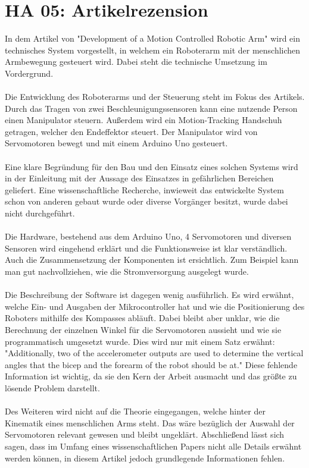 \section{HA 05: Artikelrezension}
  In dem Artikel von \cite{jiang_development_2017} "Development of a Motion Controlled Robotic Arm" wird ein technisches System vorgestellt, in welchem ein Roboterarm mit der menschlichen Armbewegung gesteuert wird. Dabei steht die technische Umsetzung im Vordergrund.\\\\
  Die Entwicklung des Roboterarms und der Steuerung steht im Fokus des Artikels. Durch das Tragen von zwei Beschleunigungssensoren kann eine nutzende Person einen Manipulator steuern. Außerdem wird ein Motion-Tracking Handschuh getragen, welcher den Endeffektor steuert. Der Manipulator wird von Servomotoren bewegt und mit einem Arduino Uno gesteuert.\\\\
  Eine klare Begründung für den Bau und den Einsatz eines solchen Systems wird in der Einleitung mit der Aussage des Einsatzes in gefährlichen Bereichen geliefert. Eine wissenschaftliche Recherche, inwieweit das entwickelte System schon von anderen gebaut wurde oder diverse Vorgänger besitzt, wurde dabei nicht durchgeführt.\\\\
  Die Hardware, bestehend aus dem Arduino Uno, 4 Servomotoren und diversen Sensoren wird eingehend erklärt und die Funktionsweise ist klar verständlich. Auch die Zusammensetzung der Komponenten ist ersichtlich. Zum Beispiel kann man gut nachvollziehen, wie die Stromversorgung ausgelegt wurde.\\\\
  Die Beschreibung der Software ist dagegen wenig ausführlich. Es wird erwähnt, welche Ein- und Ausgaben der Mikrocontroller hat und wie die Positionierung des Roboters mithilfe des Kompasses abläuft. Dabei bleibt aber unklar, wie die Berechnung der einzelnen Winkel für die Servomotoren aussieht und wie sie programmatisch umgesetzt wurde. Dies wird nur mit einem Satz erwähnt: "Additionally, two of the accelerometer outputs are used to determine the vertical angles that the bicep and the forearm of the robot should be at." Diese fehlende Information ist wichtig, da sie den Kern der Arbeit ausmacht und das größte zu lösende Problem darstellt.\\\\
  Des Weiteren wird nicht auf die Theorie eingegangen, welche hinter der Kinematik eines menschlichen Arms steht. Das wäre bezüglich der Auswahl der Servomotoren relevant gewesen und bleibt ungeklärt. Abschließend lässt sich sagen, dass im Umfang eines wissenschaftlichen Papers nicht alle Details erwähnt werden können, in diesem Artikel jedoch grundlegende Informationen fehlen.

